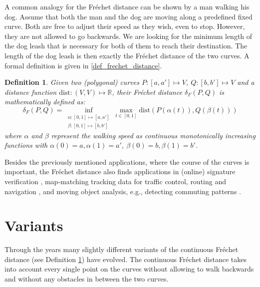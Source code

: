 \documentclass[
oneside,
fontsize=11pt
]{scrartcl}
\newtheorem{mydef}{Definition}
\begin{document}
A common analogy for the Fréchet distance can be shown by a man walking his dog. 
Assume that both the man and the dog are moving along a predefined fixed curve. 
Both are free to adjust their speed as they wish, even to stop. 
However, they are not allowed to go backwards. 
We are looking for the minimum length of the dog leash 
that is necessary for both of them to reach their destination. 
The length of the dog leash is then exactly the Fréchet distance of the two curves.
A formal definition is given in \autoref{def_frechet_distance}.

\begin{mydef}
  \label{def_frechet_distance}
  Given two (polygonal) curves $P: [a,a'] \mapsto V$, $Q: [b,b'] \mapsto V$ and a distance function $\text{dist}: (V,V) \mapsto \mathbb{R}$, 
  their Fréchet distance $\delta_{F}(P,Q)$ is mathematically defined as: 
  $$\delta_{F}(P,Q) = \inf_{\substack{\alpha: [0,1] \mapsto [a, a'] \\ \beta: [0,1] \mapsto [b, b']}} \max_{t \in [0,1]} \text{dist}(P(\alpha(t)), Q(\beta(t)))$$
  where $\alpha$ and $\beta$ represent the walking speed as 
  continuous monotonically increasing functions with
  $\alpha(0) = a, \alpha(1) = a'$, 
  $\beta(0) =b, \beta(1) =b'$.
\end{mydef}


Besides the previously mentioned applications, 
where the course of the curves is important, 
the Fréchet distance also finds applications in
(online) signature verification \cite{zheng_algorithm_2008,fang_research_2018},
map-matching tracking data for traffic control, routing and navigation \cite{wenk_addressing_2006,brakatsoulas_map-matching_2005},
and moving object analysis, e.g., detecting commuting patterns \cite{buchin_detecting_2011}.






\section{Variants}
Through the years many slightly different variants of the continuous Fréchet distance (see Definition \ref{def_frechet_distance}) have evolved. 
The continuous Fréchet distance takes into account every single point on the curves 
without allowing to walk backwards 
and without any obstacles in between the two curves.
\end{document}
